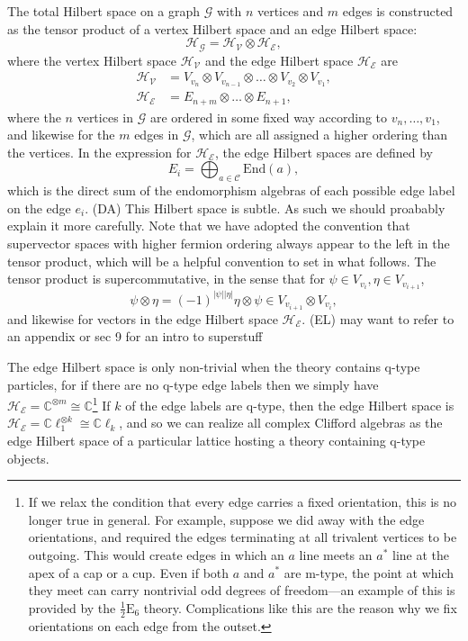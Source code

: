 \documentclass[12pt,a4paper]{article}
\newcommand{\tp}{\otimes}
\newcommand{\mce}{\mathcal{E}}
\newcommand{\cc}{\mathbb{C}}
\newcommand{\mcg}{\mathcal{G}}
\newcommand{\mch}{\mathcal{H}}
\newcommand{\mcc}{\mathcal{C}}
\newcommand{\mcv}{\mathcal{V}}
\newcommand\be            {\begin{equation}}
\newcommand\ee            {\end{equation}}
\newcommand{\End}{\text{End}}
\newcommand{\cl}{\mathbb{C}\ell}
\newcommand{\dave}[1]{{\color{ao(english)}\footnotesize{(DA) #1}}}
\newcommand{\ethan}[1]{{\color{amethyst}\footnotesize{(EL) #1}}}
\newcommand{\halfesix}{\frac{1}{2}\text{E}_6}
\begin{document}
The total Hilbert space on a graph $\mcg$ with $n$ vertices and $m$ edges is constructed as the tensor product of a vertex Hilbert space and an edge Hilbert space:
\be \mch_\mcg = \mch_\mcv \tp \mch_\mce,\ee
where the vertex Hilbert space $\mch_\mcv$ and the edge Hilbert space $\mch_\mce$ are 
\begin{align}
\mch_\mcv & = V_{v_n} \tp V_{v_{n-1}} \tp \dots \tp V_{v_2} \tp V_{v_1},\\
\mch_\mce & = E_{n+m}\tp \dots \tp E_{n+1},
\label{GraphHilbertSpace}
\end{align}
where the $n$ vertices in $\mcg$ are ordered in some fixed way according to $v_n,\dots,v_1$, and likewise for the $m$ edges in $\mcg$, which are all assigned a higher ordering than the vertices.  
In the expression for $\mch_\mce$, the edge Hilbert spaces are defined by 
\be E_i = \bigoplus_{a\in \mcc}\End(a),\ee
which is the direct sum of the endomorphism algebras of each possible edge label on the edge $e_i$.
\dave{This Hilbert space is subtle. 
As such we should proabably explain it more carefully. }
Note that we have adopted the convention that supervector spaces with higher fermion ordering always appear to the left in the tensor product, which will be a helpful convention to set in what follows. 
The tensor product is supercommutative, in the sense that for $\psi\in V_{v_i},\eta\in V_{v_{i+1}}$,
\be \psi \tp \eta = (-1)^{|\psi||\eta|}\eta\tp\psi \in V_{v_{i+1}} \tp V_{v_i},\ee
and likewise for vectors in the edge Hilbert space $\mch_\mce$. \ethan{may want to refer to an appendix or sec 9 for an intro to superstuff}

The edge Hilbert space is only non-trivial when the theory contains q-type particles, for if there are no q-type edge labels then we simply have $\mch_\mce= \cc^{\tp m} \cong \cc$\footnote{If we relax the condition that every edge carries a fixed orientation, this is no longer true in general. For example, suppose we did away with the edge orientations, and required the edges terminating at all trivalent vertices to be outgoing. This would create edges in which an $a$ line meets an $a^*$ line at the apex of a cap or a cup. Even if both $a$ and $a^*$ are m-type, the point at which they meet can carry nontrivial odd degrees of freedom---an example of this is provided by the $\halfesix$ theory. Complications like this are the reason why we fix orientations on each edge from the outset.}
If $k$ of the edge labels are q-type, then the edge Hilbert space is $\mch_\mce = \cl_1^{\tp k} \cong \cl_k$, and so we can realize all complex Clifford algebras as the edge Hilbert space of a particular lattice hosting a theory containing q-type objects. 
\end{document}
